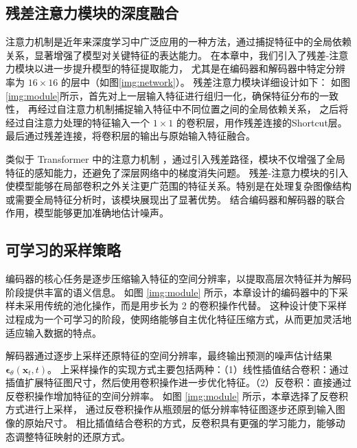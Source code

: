\subsection{残差注意力模块的深度融合}
注意力机制是近年来深度学习中广泛应用的一种方法，通过捕捉特征中的全局依赖关系，显著增强了模型对关键特征的表达能力。
在本章中，我们引入了残差-注意力模块以进一步提升模型的特征提取能力，
尤其是在编码器和解码器中特定分辨率为 $16 \times 16$ 的层中（如图\ref{img:network}）。
残差注意力模块详细设计如下：
如图\ref{img:module}所示，首先对上一层输入特征进行组归一化，确保特征分布的一致性，
再经过自注意力机制捕捉输入特征中不同位置之间的全局依赖关系，
之后将经过自注意力处理的特征输入一个 $1 \times 1$ 的卷积层，用作残差连接的Shortcut层。
最后通过残差连接，将卷积层的输出与原始输入特征融合。

类似于 Transformer 中的注意力机制 \cite{2017attention}，通过引入残差路径，模块不仅增强了全局特征的感知能力，还避免了深层网络中的梯度消失问题。
残差-注意力模块的引入使模型能够在局部卷积之外关注更广范围的特征关系。特别是在处理复杂图像结构或需要全局特征分析时，该模块展现出了显著优势。
结合编码器和解码器的联合作用，模型能够更加准确地估计噪声。

\subsection{可学习的采样策略}
编码器的核心任务是逐步压缩输入特征的空间分辨率，以提取高层次特征并为解码阶段提供丰富的语义信息。
如图 \ref{img:module} 所示，本章设计的编码器中的下采样未采用传统的池化操作，而是用步长为 2 的卷积操作代替。
这种设计使下采样过程成为一个可学习的阶段，使网络能够自主优化特征压缩方式，从而更加灵活地适应输入数据的特点。

解码器通过逐步上采样还原特征的空间分辨率，最终输出预测的噪声估计结果 $\boldsymbol{\epsilon}_\theta(\mathbf{x}_t, t)$。
上采样操作的实现方式主要包括两种：（1）线性插值结合卷积：通过插值扩展特征图尺寸，然后使用卷积操作进一步优化特征。（2）反卷积：直接通过反卷积操作增加特征的空间分辨率。
如图 \ref{img:module} 所示，本章选择了反卷积方式进行上采样，
通过反卷积操作从瓶颈层的低分辨率特征图逐步还原到输入图像的原始尺寸。
相比插值结合卷积的方式，反卷积具有更强的学习能力，能够动态调整特征映射的还原方式。

